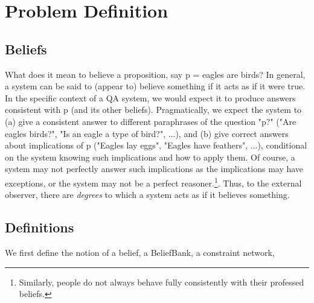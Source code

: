 \documentclass[11pt]{article}
\begin{document}
\section{Problem Definition}

\subsection{Beliefs}

What does it mean to believe a proposition, say p = eagles are birds? In general, a system can
be said to (appear to) believe something if it acts as if it were true. In the specific
context of a QA system, we would expect it to produce answers consistent with p (and
its other beliefs). Pragmatically, we expect the system to (a) give a consistent answer to
different paraphrases of the question "p?" ("Are eagles birds?", "Is an eagle a type of bird?", ...),
and (b) give correct answers about implications of p ("Eagles lay eggs", "Eagles have feathers", ...),
conditional on the system knowing such implications and how to apply them.
Of course, a system may not perfectly answer such implications as the implications
may have exceptions, or the system may not be a perfect reasoner.\footnote{Similarly,
people do not always behave fully consistently with their professed beliefs.}.
Thus, to the external observer, there are {\it degrees} to which a system acts as if it
believes something.


\subsection{Definitions \label{definitions}}

We first define the notion of a belief, a BeliefBank, a constraint network,
\end{document}
